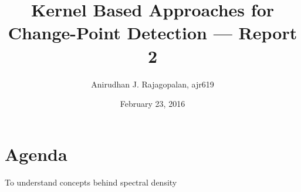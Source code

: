 \documentclass{article}
\begin{document}
\title{Kernel Based Approaches for Change-Point Detection --- Report 2}
\date{February 23, 2016}
\author{Anirudhan J. Rajagopalan, ajr619}

\maketitle

\newpage
\section{Agenda}
To understand concepts behind spectral density
\end{document}
